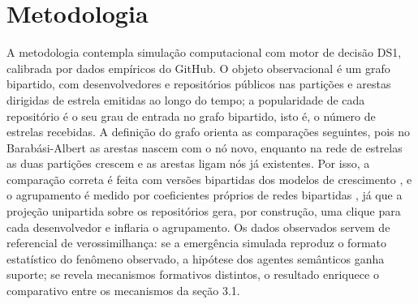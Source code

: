 \documentclass[12pt,oneside,a4paper,brazil,sumario=tradicional]{abntex2}
\begin{document}
\section{Metodologia}

A metodologia contempla simulação computacional com motor de decisão DS1, calibrada por dados empíricos do GitHub. O objeto observacional é um grafo bipartido, com desenvolvedores e repositórios públicos nas partições e arestas dirigidas de estrela emitidas ao longo do tempo; a popularidade de cada repositório é o seu grau de entrada no grafo bipartido, isto é, o número de estrelas recebidas. A definição do grafo orienta as comparações seguintes, pois no Barabási-Albert as arestas nascem com o nó novo, enquanto na rede de estrelas as duas partições crescem e as arestas ligam nós já existentes. Por isso, a comparação correta é feita com versões bipartidas dos modelos de crescimento \parencite{guillaume2006}, e o agrupamento é medido por coeficientes próprios de redes bipartidas \parencite{latapy2008, opsahl2013}, já que a projeção unipartida sobre os repositórios gera, por construção, uma clique para cada desenvolvedor e inflaria o agrupamento. Os dados observados servem de referencial de verossimilhança: se a emergência simulada reproduz o formato estatístico do fenômeno observado, a hipótese dos agentes semânticos ganha suporte; se revela mecanismos formativos distintos, o resultado enriquece o comparativo entre os mecanismos da seção 3.1.
\end{document}
